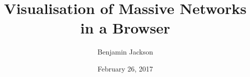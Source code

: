 \documentclass{l4proj}
\begin{document}
\title{Visualisation of Massive Networks in a Browser}
\author{Benjamin Jackson}
\date{February 26, 2017}
\maketitle



\educationalconsent

\tableofcontents

\pagebreak
{}



















\end{document}
